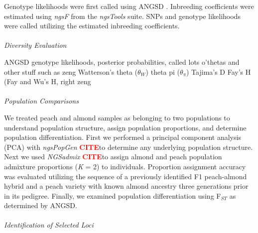 \documentclass[12pt]{article}
\newcommand{\citex}{\textcolor{red}{\bf CITE}}
\begin{document}
%
%
%
Genotype likelihoods were first called using ANGSD \citep{korneliussen2014angsd}.
%
Inbreeding coefficients were estimated using \emph{ngsF} from the \emph{ngsTools} \citep{fumagalli2014ngstools} suite.
%
SNPs and genotype likelihoods were called utilizing the estimated inbreeding coefficients.
\\
%
\\
\emph{Diversity Evaluation}

ANGSD genotype likelihoods, posterior probabilities, called lots o'thetas and other stuff such as zeng
Watterson's theta ($\theta_{W}$)
theta pi ($\theta_{\pi}$)
Tajima's D
Fay's H (Fay and Wu's H, right
zeng
\\
%
\\
\emph{Population Comparisons}

We treated peach and almond samples as belonging to two populations to understand population structure, assign population proportions, and determine population differentiation.
%
First we performed a principal component analysis (PCA) with \emph{ngsPopGen} \citex to determine any underlying population structure.
%
Next we used \emph{NGSadmix} \citex to assign almond and peach population admixture proportions (\emph{K} = 2) to individuals. 
%
Proportion assignment accuracy was evaluated utilizing the sequence of a previously identified F1 peach-almond hybrid and a peach variety with known almond ancestry three generations prior in its pedigree.
%
Finally, we examined population differentiation using F$_{ST}$ as determined by ANGSD.
\\
%
\\
\emph{Identification of Selected Loci}
\end{document}
